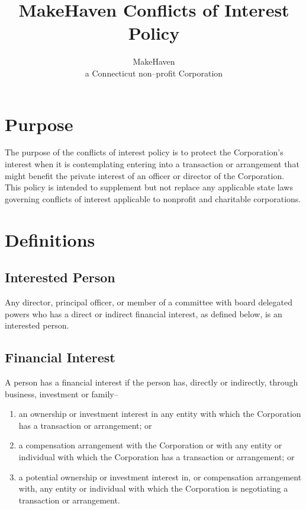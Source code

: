 \documentclass[12pt]{article}
\title{MakeHaven Conflicts of Interest Policy}
\author{MakeHaven\\a Connecticut non--profit Corporation}
\begin{document}
\maketitle



\section{Purpose}

The purpose of the conflicts of interest policy is to protect the Corporation's interest when it is contemplating entering into a transaction or arrangement that might benefit the private interest of an officer or director of the Corporation. This policy is intended to supplement but not replace any applicable state laws governing conflicts of interest applicable to nonprofit and charitable corporations. 

\section{Definitions}

\subsection{Interested Person}

Any director, principal officer, or member of a committee with board delegated powers who has a direct or indirect financial interest, as defined below, is an interested person.

\subsection{Financial Interest} 

A person has a financial interest if the person has, directly or indirectly, through business, investment or family-- 
\begin{enumerate}
  \item an ownership or investment interest in any entity with which the Corporation has a transaction or arrangement; or 
  \item a compensation arrangement with the Corporation or with any entity or individual with which the Corporation has a transaction or arrangement; or 
  \item a potential ownership or investment interest in, or compensation arrangement with, any entity or individual with which the Corporation is negotiating a transaction or arrangement. 

\end{enumerate}
\end{document}
